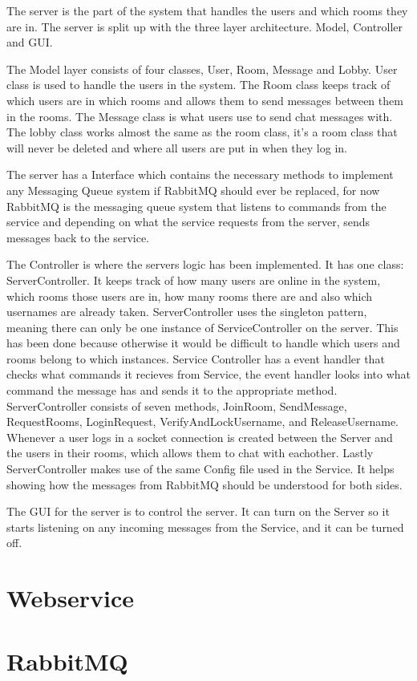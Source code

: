 The server is the part of the system that handles the users and which rooms they are in. The server is split up with the three layer architecture. Model, Controller and GUI. 

The Model layer consists of four classes, User, Room, Message and Lobby. User class is used to handle the users in the system. The Room class keeps track of which users are in which rooms and allows them to send messages between them in the rooms. The Message class is what users use to send chat messages with. The lobby class works almost the same as the room class, it's a room class that will never be deleted and where all users are put in when they log in.


The server has a Interface which contains the necessary methods to implement any Messaging Queue system if RabbitMQ should ever be replaced, for now RabbitMQ is the messaging queue system that listens to commands from the service and depending on what the service requests from the server, sends messages back to the service.

The Controller is where the servers logic has been implemented. It has one class: ServerController. It keeps track of how many users are online in the system, which rooms those users are in, how many rooms there are and also which usernames are already taken. ServerController uses the singleton pattern, meaning there can only be one instance of ServiceController on the server. This has been done because otherwise it would be difficult to handle which users and rooms belong to which instances. Service Controller has a event handler that checks what commands it recieves from Service, the event handler looks into what command the message has and sends it to the appropriate method. ServerController consists of seven methods, JoinRoom, SendMessage, RequestRooms, LoginRequest, VerifyAndLockUsername, and ReleaseUsername. Whenever a user logs in a socket connection is created between the Server and the users in their rooms, which allows them to chat with eachother. Lastly ServerController makes use of the same Config file used in the Service. It helps showing how the messages from RabbitMQ should be understood for both sides.



The GUI for the server is to control the server. It can turn on the Server so it starts listening on any incoming messages from the Service, and it can be turned off. 


\section{Webservice}

\section{RabbitMQ}